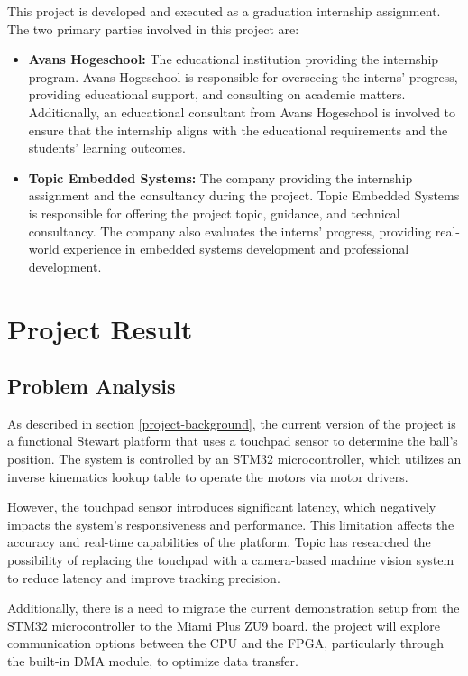 \documentclass{article}
\begin{document}
This project is developed and executed as a graduation internship assignment.
The two primary parties involved in this project are:

\begin{itemize} 
    \item \textbf{Avans Hogeschool:} The educational institution
providing the internship program. Avans Hogeschool is responsible for overseeing
the interns' progress, providing educational support, and consulting on academic
matters. Additionally, an educational consultant from Avans Hogeschool is
involved to ensure that the internship aligns with the educational requirements
and the students' learning outcomes. 
\item \textbf{Topic Embedded Systems:} The
company providing the internship assignment and the consultancy during the
project. Topic Embedded Systems is responsible for offering the project topic,
guidance, and technical consultancy. The company also evaluates the interns'
progress, providing real-world experience in embedded systems development and
professional development. 
\end{itemize}




\newpage
\section{Project Result}


\subsection{Problem Analysis} As described in section \ref{project-background},
the current version of the project is a functional Stewart platform that uses a
touchpad sensor to determine the ball's position. The system is controlled by an
STM32 microcontroller, which utilizes an inverse kinematics lookup table to
operate the motors via motor drivers.

However, the touchpad sensor introduces significant latency, which negatively
impacts the system’s responsiveness and performance. This limitation affects the
accuracy and real-time capabilities of the platform. Topic has researched the
possibility of replacing the touchpad with a camera-based machine vision system
to reduce latency and improve tracking precision.

Additionally, there is a need to migrate the current demonstration setup from
the STM32 microcontroller to the Miami Plus ZU9 board.
the project will explore communication options between the CPU and the FPGA,
particularly through the built-in DMA module, to optimize data transfer.
\end{document}
